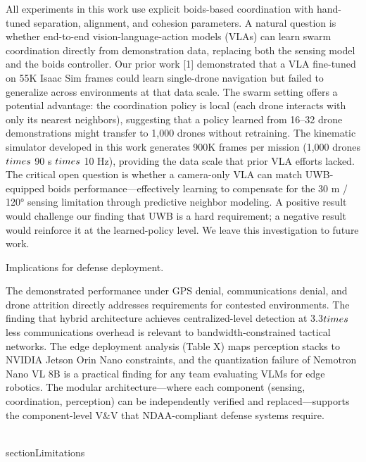 \documentclass[conference]{IEEEtran}
\begin{document}
All experiments in this work use explicit boids-based coordination with
hand-tuned separation, alignment, and cohesion parameters. A natural
question is whether end-to-end vision-language-action models (VLAs) can
learn swarm coordination directly from demonstration data, replacing
both the sensing model and the boids controller. Our prior work [1]
demonstrated that a VLA fine-tuned on 55K Isaac Sim frames could learn
single-drone navigation but failed to generalize across environments at
that data scale. The swarm setting offers a potential advantage: the
coordination policy is local (each drone interacts with only its nearest
neighbors), suggesting that a policy learned from 16--32 drone
demonstrations might transfer to 1,000 drones without retraining. The
kinematic simulator developed in this work generates 900K frames per
mission (1,000 drones $\\times$ 90 s $\\times$ 10 Hz), providing the data scale that
prior VLA efforts lacked. The critical open question is whether a
camera-only VLA can match UWB-equipped boids performance---effectively
learning to compensate for the 30 m / 120° sensing limitation through
predictive neighbor modeling. A positive result would challenge our
finding that UWB is a hard requirement; a negative result would
reinforce it at the learned-policy level. We leave this investigation to
future work.

Implications for defense deployment.

The demonstrated performance under GPS denial, communications denial,
and drone attrition directly addresses requirements for contested
environments. The finding that hybrid architecture achieves
centralized-level detection at 3.3$\\times$ less communications overhead is
relevant to bandwidth-constrained tactical networks. The edge deployment
analysis (Table X) maps perception stacks to NVIDIA Jetson Orin Nano
constraints, and the quantization failure of Nemotron Nano VL 8B is a
practical finding for any team evaluating VLMs for edge robotics. The
modular architecture---where each component (sensing, coordination,
perception) can be independently verified and replaced---supports the
component-level V\&V that NDAA-compliant defense systems require.

\\section{Limitations}\label{ix.-limitations}
\end{document}
